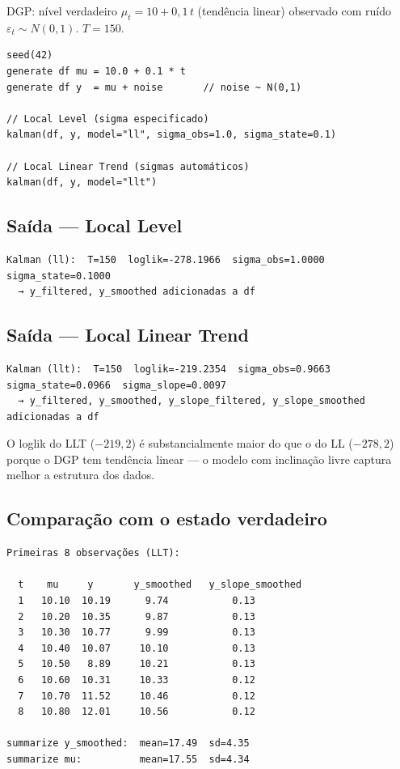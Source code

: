 DGP: nível verdadeiro $\mu_t = 10 + 0{,}1\,t$ (tendência linear) observado
com ruído $\varepsilon_t \sim N(0, 1)$. $T = 150$.

\begin{lstlisting}[caption={Filtro de Kalman: LL e LLT}]
seed(42)
generate df mu = 10.0 + 0.1 * t
generate df y  = mu + noise       // noise ~ N(0,1)

// Local Level (sigma especificado)
kalman(df, y, model="ll", sigma_obs=1.0, sigma_state=0.1)

// Local Linear Trend (sigmas automáticos)
kalman(df, y, model="llt")
\end{lstlisting}

\subsection*{Saída — Local Level}

\begin{lstlisting}[language={}, basicstyle=\ttfamily\small, frame=none,
  numbers=none, backgroundcolor=\color{codbg}]
Kalman (ll):  T=150  loglik=-278.1966  sigma_obs=1.0000  sigma_state=0.1000
  → y_filtered, y_smoothed adicionadas a df
\end{lstlisting}

\subsection*{Saída — Local Linear Trend}

\begin{lstlisting}[language={}, basicstyle=\ttfamily\small, frame=none,
  numbers=none, backgroundcolor=\color{codbg}]
Kalman (llt):  T=150  loglik=-219.2354  sigma_obs=0.9663  sigma_state=0.0966  sigma_slope=0.0097
  → y_filtered, y_smoothed, y_slope_filtered, y_slope_smoothed adicionadas a df
\end{lstlisting}

O loglik do LLT ($-219{,}2$) é substancialmente maior do que o do LL
($-278{,}2$) porque o DGP tem tendência linear — o modelo com inclinação
livre captura melhor a estrutura dos dados.

\subsection*{Comparação com o estado verdadeiro}

\begin{lstlisting}[language={}, basicstyle=\ttfamily\small, frame=none,
  numbers=none, backgroundcolor=\color{codbg}]
Primeiras 8 observações (LLT):

  t    mu     y       y_smoothed   y_slope_smoothed
  1   10.10  10.19      9.74           0.13
  2   10.20  10.35      9.87           0.13
  3   10.30  10.77      9.99           0.13
  4   10.40  10.07     10.10           0.13
  5   10.50   8.89     10.21           0.13
  6   10.60  10.31     10.33           0.12
  7   10.70  11.52     10.46           0.12
  8   10.80  12.01     10.56           0.12

summarize y_smoothed:  mean=17.49  sd=4.35
summarize mu:          mean=17.55  sd=4.34
\end{lstlisting}

